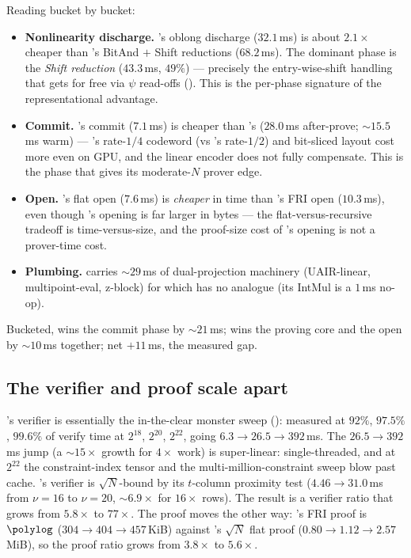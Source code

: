 Reading  bucket by bucket:
\begin{itemize}
  \item \textbf{Nonlinearity discharge.} \zinc{}'s oblong discharge
  ($32.1$\,ms) is about $2.1\times$ cheaper than \binius{}'s BitAnd $+$
  Shift reductions ($68.2$\,ms). The dominant \binius{} phase is the
  \emph{Shift reduction} ($43.3$\,ms, $49\%$) --- precisely the
  entry-wise-shift handling that \zinc{} gets for free via $\psi$
  read-offs (). This is the per-phase signature of the
  representational advantage.
  \item \textbf{Commit.} \binius{}'s commit ($7.1$\,ms) is cheaper than
  \zinc{}'s ($28.0$\,ms after-prove; $\sim$$15.5$\,ms warm) --- \zinc{}'s
  rate-$1/4$ codeword (vs \binius{}'s rate-$1/2$) and bit-sliced layout
  cost more even on GPU, and the linear encoder does not fully
  compensate. This is the phase that gives \binius{} its moderate-$N$
  prover edge.
  \item \textbf{Open.} \zinc{}'s flat open ($7.6$\,ms) is \emph{cheaper}
  in time than \binius{}'s FRI open ($10.3$\,ms), even though \zinc{}'s
  opening is far larger in bytes --- the flat-versus-recursive tradeoff
  is time-versus-size, and the proof-size cost of \zinc{}'s opening is not
  a prover-time cost.
  \item \textbf{Plumbing.} \zinc{} carries $\sim$$29$\,ms of dual-projection
  machinery (UAIR-linear, multipoint-eval, z-block) for which \binius{}
  has no analogue (its IntMul is a $1$\,ms no-op).
\end{itemize}
Bucketed, \binius{} wins the commit phase by $\sim$$21$\,ms; \zinc{} wins
the proving core and the open by $\sim$$10$\,ms together; net \binius{}
$+11$\,ms, the measured gap.

\subsection{The verifier and proof scale apart}
\label{sec:res-scaling}

\binius{}'s verifier is essentially the in-the-clear monster sweep
(): measured at $92\%$, $97.5\%$, $99.6\%$ of verify time
at $2^{18}$, $2^{20}$, $2^{22}$, going $6.3 \to 26.5 \to 392$\,ms. The
$26.5\to392$\,ms jump (a $\sim$$15\times$ growth for $4\times$ work) is
super-linear: single-threaded, and at $2^{22}$ the constraint-index
tensor and the multi-million-constraint sweep blow past cache. \zinc{}'s
verifier is $\sqrt N$-bound by its $t$-column proximity test
($4.46 \to 31.0$\,ms from $\nu{=}16$ to $\nu{=}20$, $\sim$$6.9\times$ for
$16\times$ rows). The result is a verifier ratio that grows from
$5.8\times$ to $77\times$. The proof moves the other way: \binius{}'s
FRI proof is $\polylog$ ($304\to404\to457$\,KiB) against \zinc{}'s
$\sqrt N$ flat proof ($0.80\to1.12\to2.57$\,MiB), so the proof ratio
grows from $3.8\times$ to $5.6\times$.

